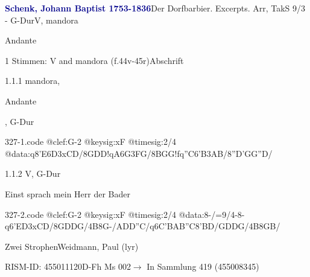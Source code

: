 \documentclass[twocolumn, 12pt]{book}
\begin{document}
\par \vspace{16pt} \textcolor{darkblue}{\textbf{Schenk, Johann Baptist  1753-1836}}\hfillplus{\textbf{[327]}}\newline Der Dorfbarbier. Excerpts. Arr, TakS 9/3 - G-Dur\newline V, mandora
\par \begin{itshape}[at left, f.44v:] Andante\end{itshape} 
\par \textcolor{darkblue}{}  1 Stimmen: V and mandora  (f.44v-45r)\newline Abschrift
\par 1.1.1  mandora, \begin{itshape}Andante\end{itshape}, G-Dur  
\begin{filecontents*}{327-1.code}
@clef:G-2
@keysig:xF
@timesig:2/4
@data:q8'E{6D3xCD}/{8GDD}!qA{6G3FG}/{8BGG}!fq''C{6'B3AB}/{8''D'GG''D}/
\end{filecontents*}
\newline %
\par 1.1.2  V, G-Dur\newline \begin{footnotesize} Einst sprach mein Herr der Bader \end{footnotesize}  
\begin{filecontents*}{327-2.code}
@clef:G-2
@keysig:xF
@timesig:2/4
@data:8-/=9/4-8-q6'E{D3xCD}/{8GDDG}/4B8G-/{ADD''C}/q6C{'BAB''C}{8'BD}/{GDDG}/4B{8GB}/
\end{filecontents*}
\newline %
\par Zwei Strophen\newline Weidmann, Paul  (lyr)
\par RISM-ID: 455011120\newline D-Fh  Ms 002\newline $\rightarrow$ In Sammlung 419 (455008345)
      
\end{document}
